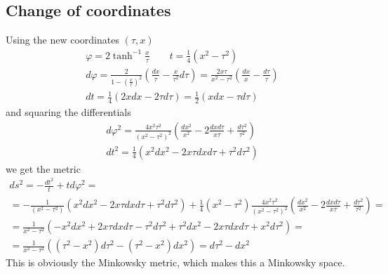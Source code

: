 \documentclass{article}
\begin{document}
\subsection{Change of coordinates}
Using the new coordinates $\left(\tau, x\right)$
\begin{equation}
\begin{gathered}
    \varphi = 2\tanh^{-1}\frac{x}{\tau} \qquad t = \frac{1}{4}\left(x^2 - \tau^2\right)
    \\
    d\varphi = \frac{2}{1- \left(\frac{x}{\tau}\right)^2}\left(\frac{dx}{\tau} - \frac{x}{\tau^2}d\tau\right) = \frac{2x\tau}{x^2 - \tau^2}\left(\frac{dx}{x} - \frac{d\tau}{\tau}\right)
    \\
    dt = \frac{1}{4}\left(2xdx - 2\tau d\tau\right) = \frac{1}{2}\left(xdx - \tau d\tau\right)
\end{gathered}
\end{equation}
and squaring the differentials
\begin{equation}
\begin{gathered}
    d\varphi^2 = \frac{4x^2\tau^2}{\left(x^2 - \tau^2\right)^2}\left(\frac{dx^2}{x^2} - 2\frac{dxd\tau}{x\tau} + \frac{d\tau^2}{\tau^2}\right)
    \\
    dt^2 = \frac{1}{4}\left(x^2dx^2 - 2x\tau dx d\tau + \tau^2 d\tau^2\right)
\end{gathered}
\end{equation}
we get the metric
\begin{equation}
\begin{gathered}
    ds^2 = -\frac{dt^2}{t} + td\varphi^2 =
    \\
    = -\frac{1}{\left(x^2 - \tau^2\right)}\left(x^2dx^2 - 2x\tau dx d\tau + \tau^2 d\tau^2\right) + \frac{1}{4}\left(x^2 - \tau^2\right)\frac{4x^2\tau^2}{\left(x^2 - \tau^2\right)^2}\left(\frac{dx^2}{x^2} - 2\frac{dxd\tau}{x\tau} + \frac{d\tau^2}{\tau^2}\right) =
    \\
    = \frac{1}{x^2 - \tau^2}\left(
        - x^2dx^2 + 2x\tau dx d\tau - \tau^2 d\tau^2
        + \tau^2dx^2 - 2x\tau dxd\tau + x^2d\tau^2
    \right) = 
    \\
    = \frac{1}{x^2 - \tau^2}\left(\left(\tau^2 - x^2\right)d\tau^2-\left(\tau^2 - x^2\right)dx^2\right) = d\tau^2 - dx^2
\end{gathered}
\end{equation}
This is obviously the Minkowsky metric, which makes this a Minkowsky space.
\end{document}
